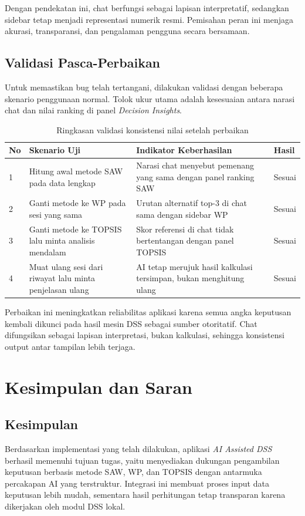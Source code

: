 \documentclass[12pt,a4paper]{article}
\begin{document}
Dengan pendekatan ini, chat berfungsi sebagai lapisan interpretatif, sedangkan sidebar tetap menjadi representasi numerik resmi. Pemisahan peran ini menjaga akurasi, transparansi, dan pengalaman pengguna secara bersamaan.

\subsection{Validasi Pasca-Perbaikan}
Untuk memastikan bug telah tertangani, dilakukan validasi dengan beberapa skenario penggunaan normal. Tolok ukur utama adalah kesesuaian antara narasi chat dan nilai ranking di panel \textit{Decision Insights}.

\begin{table}[H]
  \centering
  \caption{Ringkasan validasi konsistensi nilai setelah perbaikan}
  \small
  \begin{tabular}{p{} p{} p{} p{}}
    \toprule
    No & Skenario Uji & Indikator Keberhasilan & Hasil \\
    \midrule
    1 & Hitung awal metode SAW pada data lengkap & Narasi chat menyebut pemenang yang sama dengan panel ranking SAW & Sesuai \\
    2 & Ganti metode ke WP pada sesi yang sama & Urutan alternatif top-3 di chat sama dengan sidebar WP & Sesuai \\
    3 & Ganti metode ke TOPSIS lalu minta analisis mendalam & Skor referensi di chat tidak bertentangan dengan panel TOPSIS & Sesuai \\
    4 & Muat ulang sesi dari riwayat lalu minta penjelasan ulang & AI tetap merujuk hasil kalkulasi tersimpan, bukan menghitung ulang & Sesuai \\
    \bottomrule
  \end{tabular}
\end{table}

Perbaikan ini meningkatkan reliabilitas aplikasi karena semua angka keputusan kembali dikunci pada hasil mesin DSS sebagai sumber otoritatif. Chat difungsikan sebagai lapisan interpretasi, bukan kalkulasi, sehingga konsistensi output antar tampilan lebih terjaga.

\section{Kesimpulan dan Saran}
\subsection{Kesimpulan}
Berdasarkan implementasi yang telah dilakukan, aplikasi \textit{AI Assisted DSS} berhasil memenuhi tujuan tugas, yaitu menyediakan dukungan pengambilan keputusan berbasis metode SAW, WP, dan TOPSIS dengan antarmuka percakapan AI yang terstruktur. Integrasi ini membuat proses input data keputusan lebih mudah, sementara hasil perhitungan tetap transparan karena dikerjakan oleh modul DSS lokal.
\end{document}
